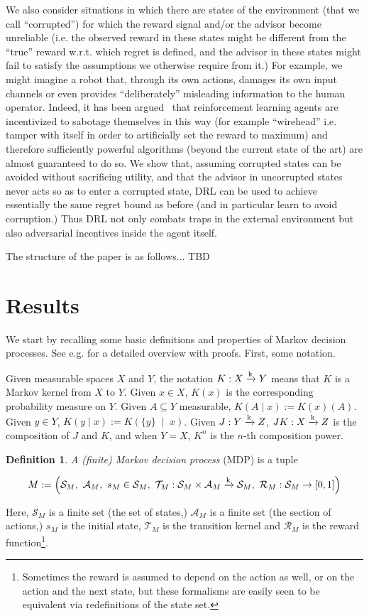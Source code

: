 \documentclass[11pt]{article}
\theoremstyle{definition}
\newtheorem{definition}{Definition}%
\theoremstyle{plain}
\newcommand{\AP}[1]{\left(#1\right)}
\newcommand{\APM}[2]{\left(#1\;\middle\vert\;#2\right)}
\newcommand{\K}{\xrightarrow{\textnormal{k}}}
\newcommand{\A}{\mathcal{A}}
\newcommand{\St}{\mathcal{S}}
\newcommand{\T}{\mathcal{T}}
\newcommand{\R}{\mathcal{R}}
\begin{document}
We also consider situations in which there are states of the environment (that we call \enquote{corrupted}) for which the reward signal and/or the advisor become unreliable (i.e. the observed reward in these states might be different from the \enquote{true} reward w.r.t. which regret is defined, and the advisor in these states might fail to satisfy the assumptions we otherwise require from it.) For example, we might imagine a robot that, through its own actions, damages its own input channels or even provides \enquote{deliberately} misleading information to the human operator. Indeed, it has been argued~\cite{TBD} that reinforcement learning agents are incentivized to sabotage themselves in this way (for example \enquote{wirehead} i.e. tamper with itself in order to artificially set the reward to maximum) and therefore sufficiently powerful algorithms (beyond the current state of the art) are almost guaranteed to do so. We show that, assuming corrupted states can be avoided without sacrificing utility, and that the advisor in uncorrupted states never acts so as to enter a corrupted state, DRL can be used to achieve essentially the same regret bound as before (and in particular learn to avoid corruption.) Thus DRL not only combats traps in the external environment but also adversarial incentives inside the agent itself.

The structure of the paper is as follows... TBD

\section{Results}

We start by recalling some basic definitions and properties of Markov decision processes. See e.g. \cite{Feinberg2002} for a detailed overview with proofs. First, some notation. 

Given measurable spaces $X$ and $Y$, the notation $K: X \K Y$ means that $K$ is a Markov kernel from $X$ to $Y$. Given $x \in X$, $K(x)$ is the corresponding probability measure on $Y$. Given $A \subseteq Y$ measurable, $K(A \mid x) := K(x)(A)$. Given $y \in Y$, $K(y \mid x):=K\APM{\{y\}}{x}$. Given $J: Y \K Z$, $JK: X \K Z$ is the composition of $J$ and $K$, and when $Y = X$, $K^n$ is the $n$-th composition power.

\begin{samepage}
\begin{definition}

\emph{A (finite) Markov decision process} (MDP) is a tuple

$$M:=\AP{\St_M,\ \A_M,\ s_M\in \St_M,\ \T_M: \St_M \times \A_M \K \St_M,\ \R_M: \St_M \rightarrow [0,1]}$$

Here, $\St_M$ is a finite set (the set of states,) $\A_M$ is a finite set (the section of actions,) $s_M$ is the initial state, $\T_M$ is the transition kernel and $\R_M$ is the reward function\footnote{Sometimes the reward is assumed to depend on the action as well, or on the action and the next state, but these formalisms are easily seen to be equivalent via redefinitions of the state set.}.

\end{definition}
\end{samepage}
\end{document}
